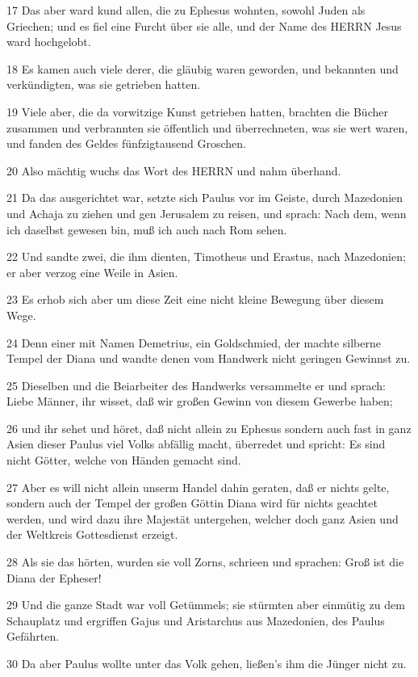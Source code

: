 \par 17 Das aber ward kund allen, die zu Ephesus wohnten, sowohl Juden als Griechen; und es fiel eine Furcht über sie alle, und der Name des HERRN Jesus ward hochgelobt.
\par 18 Es kamen auch viele derer, die gläubig waren geworden, und bekannten und verkündigten, was sie getrieben hatten.
\par 19 Viele aber, die da vorwitzige Kunst getrieben hatten, brachten die Bücher zusammen und verbrannten sie öffentlich und überrechneten, was sie wert waren, und fanden des Geldes fünfzigtausend Groschen.
\par 20 Also mächtig wuchs das Wort des HERRN und nahm überhand.
\par 21 Da das ausgerichtet war, setzte sich Paulus vor im Geiste, durch Mazedonien und Achaja zu ziehen und gen Jerusalem zu reisen, und sprach: Nach dem, wenn ich daselbst gewesen bin, muß ich auch nach Rom sehen.
\par 22 Und sandte zwei, die ihm dienten, Timotheus und Erastus, nach Mazedonien; er aber verzog eine Weile in Asien.
\par 23 Es erhob sich aber um diese Zeit eine nicht kleine Bewegung über diesem Wege.
\par 24 Denn einer mit Namen Demetrius, ein Goldschmied, der machte silberne Tempel der Diana und wandte denen vom Handwerk nicht geringen Gewinnst zu.
\par 25 Dieselben und die Beiarbeiter des Handwerks versammelte er und sprach: Liebe Männer, ihr wisset, daß wir großen Gewinn von diesem Gewerbe haben;
\par 26 und ihr sehet und höret, daß nicht allein zu Ephesus sondern auch fast in ganz Asien dieser Paulus viel Volks abfällig macht, überredet und spricht: Es sind nicht Götter, welche von Händen gemacht sind.
\par 27 Aber es will nicht allein unserm Handel dahin geraten, daß er nichts gelte, sondern auch der Tempel der großen Göttin Diana wird für nichts geachtet werden, und wird dazu ihre Majestät untergehen, welcher doch ganz Asien und der Weltkreis Gottesdienst erzeigt.
\par 28 Als sie das hörten, wurden sie voll Zorns, schrieen und sprachen: Groß ist die Diana der Epheser!
\par 29 Und die ganze Stadt war voll Getümmels; sie stürmten aber einmütig zu dem Schauplatz und ergriffen Gajus und Aristarchus aus Mazedonien, des Paulus Gefährten.
\par 30 Da aber Paulus wollte unter das Volk gehen, ließen's ihm die Jünger nicht zu.
